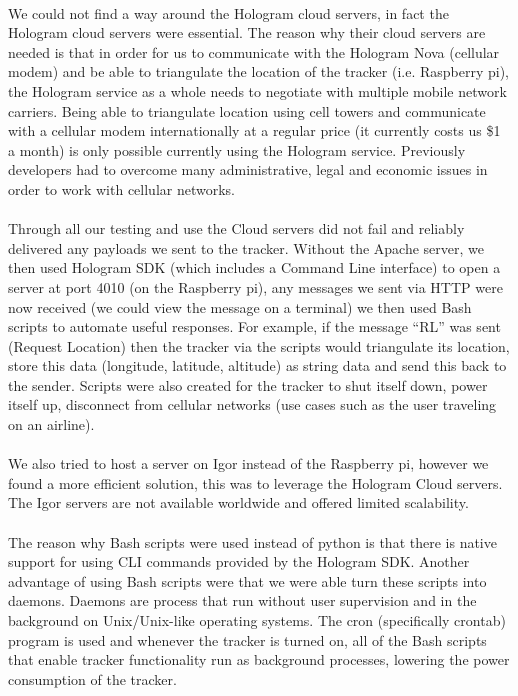 \documentclass[12pt,a4paper]{article}
\begin{document}
        \paragraph{} We could not find a way around the Hologram cloud servers, in fact the Hologram cloud servers were essential. The reason why their cloud servers are needed is that in order for us to communicate with the Hologram Nova (cellular modem) and be able to triangulate the location of the tracker (i.e. Raspberry pi), the Hologram service as a whole needs to negotiate with multiple mobile network carriers. Being able to triangulate location using cell towers and communicate with a cellular modem internationally at a regular price (it currently costs us \$1 a month) is only possible currently using the Hologram service. Previously developers had to overcome many administrative, legal and economic issues in order to work with cellular networks.  
        
        \paragraph{} Through all our testing and use the Cloud servers did not fail and reliably delivered any payloads we sent to the tracker. Without the Apache server, we then used Hologram SDK (which includes a Command Line interface) to open a server at port 4010 (on the Raspberry pi), any messages we sent via HTTP were now received (we could view the message on a terminal) we then used Bash scripts to automate useful responses. For example, if the message “RL” was sent (Request Location) then the tracker via the scripts would triangulate its location, store this data (longitude, latitude, altitude) as string data and send this back to the sender. Scripts were also created for the tracker to shut itself down, power itself up, disconnect from cellular networks (use cases such as the user traveling on an airline).
        
        \paragraph{} We also tried to host a server on Igor instead of the Raspberry pi, however we found a more efficient solution, this was to leverage the Hologram Cloud servers. The Igor servers are not available worldwide and offered limited scalability. 
        
        \paragraph{} The reason why Bash scripts were used instead of python is that there is native support for using CLI commands provided by the Hologram SDK. Another advantage of using Bash scripts were that we were able turn these scripts into daemons. Daemons are process that run without user supervision and in the background on Unix/Unix-like operating systems. The cron (specifically crontab) program is used and whenever the tracker is turned on, all of the Bash scripts that enable tracker functionality run as background processes, lowering the power consumption of the tracker.
        
\end{document}
